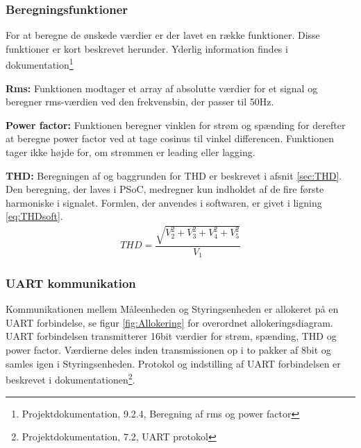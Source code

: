 
\subsubsection{Beregningsfunktioner}
For at beregne de ønskede værdier er der lavet en række funktioner. Disse funktioner er kort beskrevet herunder. Yderlig information findes i dokumentation\footnote{Projektdokumentation, 9.2.4, Beregning af rms og power factor}

\textbf{Rms:}
Funktionen modtager et array af absolutte værdier for et signal og beregner rms-værdien ved den frekvensbin, der passer til 50Hz.

\textbf{Power factor:}
Funktionen beregner vinklen for strøm og spænding for derefter at beregne power factor ved at tage cosinus til vinkel differencen. Funktionen tager ikke højde for, om strømmen er leading eller lagging.

\textbf{THD:}
Beregningen af og baggrunden for THD er beskrevet i afsnit \ref{sec:THD}. Den beregning, der laves i PSoC, medregner kun indholdet af de fire første harmoniske i signalet. Formlen, der anvendes i softwaren, er givet i ligning \ref{eq:THDsoft}.
\begin{align}
\label{eq:THDsoft}
THD = \dfrac{\sqrt{V_2^{2}+V_3^{2}+V_4^{2}+V_5^{2}}}{V_{1}}
\end{align}
 

\subsubsection{UART kommunikation}
Kommunikationen mellem Måleenheden og Styringsenheden er allokeret på en UART forbindelse, se figur \ref{fig:Allokering} for overordnet allokeringsdiagram. UART forbindelsen transmitterer 16bit værdier for strøm, spænding, THD og power factor. Værdierne deles inden transmissionen op i to pakker af 8bit og samles igen i Styringsenheden. Protokol og indstilling af UART forbindelsen er beskrevet i dokumentationen\footnote{Projektdokumentation, 7.2, UART protokol}.




